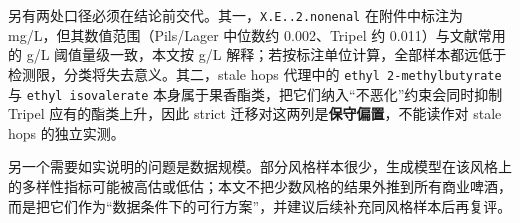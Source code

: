 另有两处口径必须在结论前交代。其一，\texttt{X.E..2.nonenal} 在附件中标注为 mg/L，但其数值范围（Pils/Lager 中位数约 0.002、Tripel 约 0.011）与文献常用的 \textmu g/L 阈值量级一致，本文按 \textmu g/L 解释；若按标注单位计算，全部样本都远低于检测限，分类将失去意义。其二，stale hops 代理中的 \texttt{ethyl 2-methylbutyrate} 与 \texttt{ethyl isovalerate} 本身属于果香酯类，把它们纳入“不恶化”约束会同时抑制 Tripel 应有的酯类上升，因此 strict 迁移对这两列是\textbf{保守偏置}，不能读作对 stale hops 的独立实测。

另一个需要如实说明的问题是数据规模。部分风格样本很少，生成模型在该风格上的多样性指标可能被高估或低估；本文不把少数风格的结果外推到所有商业啤酒，而是把它们作为“数据条件下的可行方案”，并建议后续补充同风格样本后再复评。
